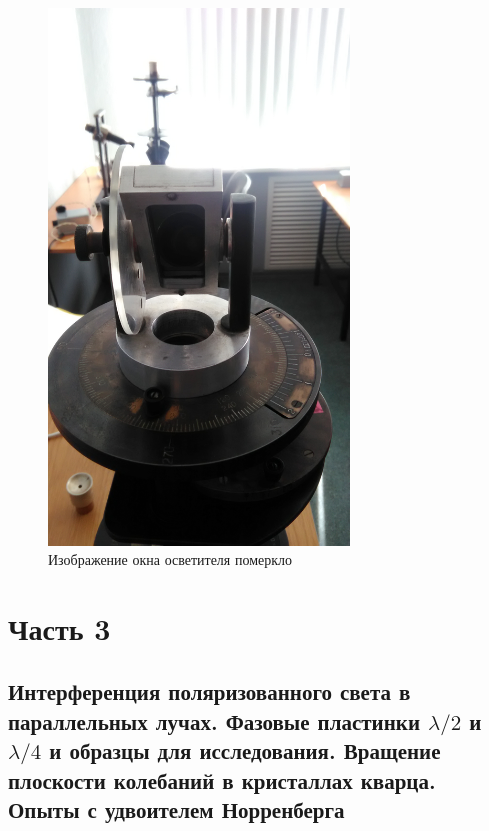 \begin{figure}[H]
	\centering
	\includegraphics[width=8cm]{pic/b2.jpg}
	\caption{Изображение окна осветителя померкло}
	\label{fig:figure4}
\end{figure}

\section{Часть 3}
\subsection{Интерференция поляризованного света в параллельных лучах.
Фазовые пластинки $\lambda/2$ и $\lambda/4$ и образцы для исследования. Вращение плоскости колебаний в кристаллах кварца. Опыты с удвоителем Норренберга}



